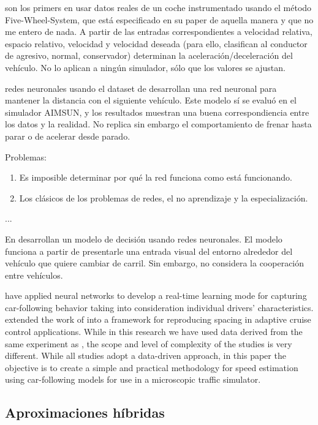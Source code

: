 \cite{Jia2003} son los primers en usar datos reales de un coche instrumentado usando el método Five-Wheel-System, que está especificado en su paper de aquella manera y que no me entero de nada. A partir de las entradas correspondientes a velocidad relativa, espacio relativo, velocidad y velocidad deseada (para ello, clasifican al conductor de agresivo, normal, conservador) determinan la aceleración/deceleración del vehículo. No lo aplican a ningún simulador, sólo que los valores se ajustan.

\cite{Panwai2007} redes neuronales usando el dataset de \cite{Manstetten1997} desarrollan una red neuronal para mantener la distancia con el siguiente vehículo. Este modelo sí se evaluó en el simulador AIMSUN, y los resultados muestran una buena correspondiencia entre los datos y la realidad. No replica sin embargo el comportamiento de frenar hasta parar o de acelerar desde parado.

\cite{Khodayari2012}


Problemas:

\begin{enumerate}
	\item Es imposible determinar por qué la red funciona como está funcionando.
	\item Los clásicos de los problemas de redes, el no aprendizaje y la especialización.
\end{enumerate}

...

En \cite{Hunt1994} desarrollan un modelo de decisión usando redes neuronales. El modelo funciona a partir de presentarle una entrada visual del entorno alrededor del vehículo que quiere cambiar de carril. Sin embargo, no considera la cooperación entre vehículos.

\cite{Simonelli2009} have applied neural networks to develop a real-time learning mode for capturing car-following behavior taking into consideration individual drivers’ characteristics. \cite{Bifulco2014} extended the work of \cite{Simonelli2009} into a framework for reproducing spacing in adaptive cruise control applications. While in this research we have used data derived from the same experiment as \cite{Simonelli2009}, the scope and level of complexity of the studies is very different. While all studies adopt a data-driven approach, in this paper the objective is to create a simple and practical methodology for speed estimation using car-following models for use in a microscopic traffic simulator.


\subsection{Aproximaciones híbridas}

